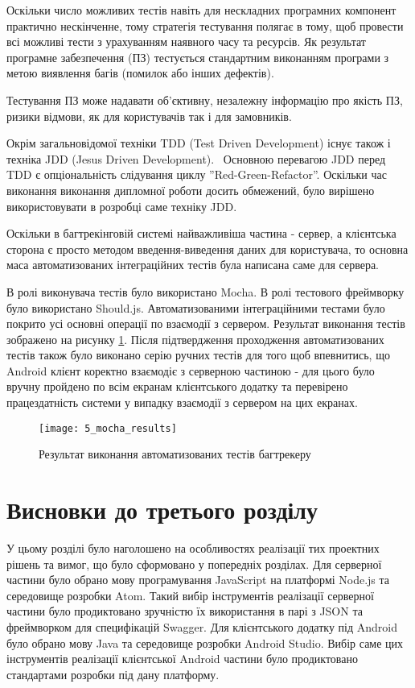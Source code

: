 \documentclass[../main.tex]{subfiles}
\begin{document}
	Оскільки число можливих тестів навіть для нескладних програмних компонент практично нескінченне, тому стратегія тестування полягає в тому, щоб провести всі можливі тести з урахуванням наявного часу та ресурсів. Як результат програмне забезпечення (ПЗ) тестується стандартним виконанням програми з метою виявлення багів (помилок або інших дефектів).~\cite{software_testing}
	
	Тестування ПЗ може надавати об'єктивну, незалежну інформацію про якість ПЗ, ризики відмови, як для користувачів так і для замовників.~\cite{agile_testing}
	
	Окрім загальновідомої техніки TDD (Test Driven Development) існує також і техніка JDD (Jesus Driven Development).~\cite{jdd} Основною перевагою JDD перед TDD є опціональність слідування циклу ''Red-Green-Refactor''. Оскільки час виконання виконання дипломної роботи досить обмежений, було вирішено використовувати в розробці саме техніку JDD.
	
	Оскільки в багтрекінговій системі найважливіша частина - сервер, а клієнтська сторона є просто методом введення-виведення даних для користувача, то основна маса автоматизованих інтеграційних тестів була написана саме для сервера.
	
	В ролі виконувача тестів було використано Mocha. В ролі тестового фреймворку було використано Should.js. Автоматизованими інтеграційними тестами було покрито усі основні операції по взаємодії з сервером. Результат виконання тестів зображено на рисунку \ref{test_results}. Після підтвердження проходження автоматизованих тестів також було виконано серію ручних тестів для того щоб впевнитись, що Android клієнт коректно взаємодіє з серверною частиною - для цього було вручну пройдено по всім екранам клієнтського додатку та перевірено працездатність системи у випадку взаємодії з сервером на цих екранах.
	
	\begin{figure}[H]
		\centering
		\texttt{[image: 5\_mocha\_results]}
		\caption{Результат виконання автоматизованих тестів багтрекеру}
		\label{test_results}
	\end{figure}

\section{Висновки до третього розділу}

	У цьому розділі було наголошено на особливостях реалізації тих проектних рішень та вимог, що було сформовано у попередніх розділах. Для серверної частини було обрано мову програмування JavaScript на платформі Node.js та середовище розробки Atom. Такий вибір інструментів реалізації серверної частини було продиктовано зручністю їх використання в парі з JSON та фреймворком для специфікацій Swagger. Для клієнтського додатку під Android було обрано мову Java та середовище розробки Android Studio. Вибір саме цих інструментів реалізації клієнтської Android частини було продиктовано стандартами розробки під дану платформу.
	
\end{document}
